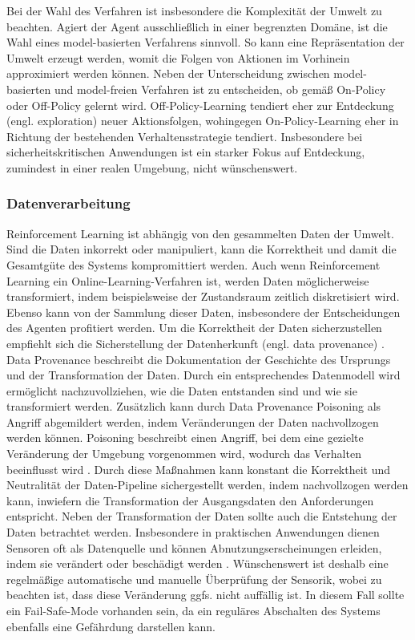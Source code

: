 Bei der Wahl des Verfahren ist insbesondere die Komplexität der Umwelt zu beachten.
Agiert der Agent ausschließlich in einer begrenzten Domäne, ist die Wahl eines model-basierten Verfahrens sinnvoll.
So kann eine Repräsentation der Umwelt erzeugt werden, womit die Folgen von Aktionen im Vorhinein approximiert werden können.
Neben der Unterscheidung zwischen model-basierten und model-freien Verfahren ist zu entscheiden, ob gemäß On-Policy oder Off-Policy gelernt wird.
Off-Policy-Learning tendiert eher zur Entdeckung (engl. exploration) \cite[S. 24]{herrmann} neuer Aktionsfolgen, wohingegen On-Policy-Learning eher in Richtung der bestehenden Verhaltensstrategie tendiert.
Insbesondere bei sicherheitskritischen Anwendungen ist ein starker Fokus auf Entdeckung, zumindest in einer realen Umgebung, nicht wünschenswert.

\subsubsection{Datenverarbeitung}
Reinforcement Learning ist abhängig von den gesammelten Daten der Umwelt.
Sind die Daten inkorrekt oder manipuliert, kann die Korrektheit und damit die Gesamtgüte des Systems kompromittiert werden.
Auch wenn Reinforcement Learning ein Online-Learning-Verfahren ist, werden Daten möglicherweise transformiert, indem beispielsweise der Zustandsraum zeitlich diskretisiert wird.
Ebenso kann von der Sammlung dieser Daten, insbesondere der Entscheidungen des Agenten profitiert werden.
Um die Korrektheit der Daten sicherzustellen empfiehlt sich die Sicherstellung der Datenherkunft (engl. data provenance) \cite[S. 3]{olufowobi2017}.
Data Provenance beschreibt die Dokumentation der Geschichte des Ursprungs und der Transformation der Daten.
Durch ein entsprechendes Datenmodell wird ermöglicht nachzuvollziehen, wie die Daten entstanden sind und wie sie transformiert werden.
Zusätzlich kann durch Data Provenance Poisoning als Angriff abgemildert werden, indem Veränderungen der Daten nachvollzogen werden können.
Poisoning beschreibt einen Angriff, bei dem eine gezielte Veränderung der Umgebung vorgenommen wird, wodurch das Verhalten beeinflusst wird \cite[S. 103]{baracaldo2017}.
Durch diese Maßnahmen kann konstant die Korrektheit und Neutralität der Daten-Pipeline sichergestellt werden, indem nachvollzogen werden kann, inwiefern die Transformation der Ausgangsdaten den Anforderungen entspricht.
\ab 
Neben der Transformation der Daten sollte auch die Entstehung der Daten betrachtet werden.
Insbesondere in praktischen Anwendungen dienen Sensoren oft als Datenquelle und können Abnutzungserscheinungen erleiden, indem sie verändert oder beschädigt werden \cite[S. 113]{kramer2009}.
Wünschenswert ist deshalb eine regelmäßige automatische und manuelle Überprüfung der Sensorik, wobei zu beachten ist, dass diese Veränderung ggfs. nicht auffällig ist.
In diesem Fall sollte ein Fail-Safe-Mode vorhanden sein, da ein reguläres Abschalten des Systems ebenfalls eine Gefährdung darstellen kann.

